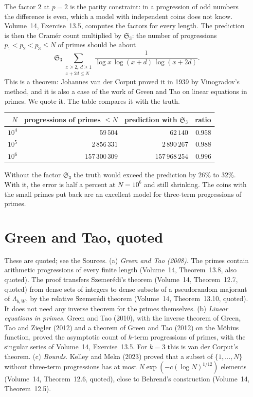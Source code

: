 The factor $2$ at $p=2$ is the parity constraint: in a progression of odd numbers the difference is even, which a model with independent coins does not know. Volume~14, Exercise~13.5, computes the factors for every length. The prediction is then the Cramér count multiplied by $\mathfrak S_3$: the number of progressions $p_1<p_2<p_3\le N$ of primes should be about
\[
\mathfrak S_3\sum_{\substack{x\ge2,\ d\ge1\\x+2d\le N}}\frac1{\log x\,\log(x+d)\,\log(x+2d)}.
\]
This is a theorem: Johannes van der Corput proved it in 1939 by Vinogradov's method, and it is also a case of the work of Green and Tao on linear equations in primes. We quote it. The table compares it with the truth.

\begin{center}
\begin{tabular}{rrrr}
$N$ & progressions of primes $\le N$ & prediction with $\mathfrak S_3$ & ratio\\\hline
$10^4$ & $59\,504$ & $62\,140$ & $0.958$\\
$10^5$ & $2\,856\,331$ & $2\,890\,267$ & $0.988$\\
$10^6$ & $157\,300\,309$ & $157\,968\,254$ & $0.996$
\end{tabular}
\end{center}

Without the factor $\mathfrak S_3$ the truth would exceed the prediction by $26\%$ to $32\%$. With it, the error is half a percent at $N=10^6$ and still shrinking. The coins with the small primes put back are an excellent model for three-term progressions of primes.

\section{Green and Tao, quoted}\label{sec:greentao}

\begin{remark}
These are quoted; see the Sources. (a) \emph{Green and Tao (2008).} The primes contain arithmetic progressions of every finite length (Volume~14, Theorem~13.8, also quoted). The proof transfers Szemer\'edi's theorem (Volume~14, Theorem~12.7, quoted) from dense sets of integers to dense subsets of a pseudorandom majorant of $\Lambda_{b,W}$, by the relative Szemer\'edi theorem (Volume~14, Theorem~13.10, quoted). It does not need any inverse theorem for the primes themselves. (b) \emph{Linear equations in primes.} Green and Tao (2010), with the inverse theorem of Green, Tao and Ziegler (2012) and a theorem of Green and Tao (2012) on the M\"obius function, proved the asymptotic count of $k$-term progressions of primes, with the singular series of Volume~14, Exercise~13.5. For $k=3$ this is van der Corput's theorem. (c) \emph{Bounds.} Kelley and Meka (2023) proved that a subset of $\{1,\dots,N\}$ without three-term progressions has at most $N\exp(-c(\log N)^{1/12})$ elements (Volume~14, Theorem~12.6, quoted), close to Behrend's construction (Volume~14, Theorem~12.5).
\end{remark}

